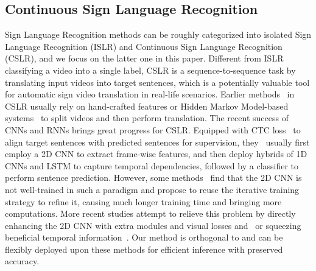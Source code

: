 \documentclass[sigconf]{acmart}
\begin{document}
\subsection{Continuous Sign Language Recognition}
Sign Language Recognition methods can be roughly categorized into isolated Sign Language Recognition (ISLR) and Continuous Sign Language Recognition (CSLR), and we focus on the latter one in this paper. Different from ISLR classifying a video into a single label, CSLR is a sequence-to-sequence task by translating input videos into target sentences, which is a potentially valuable tool for automatic sign video translation in real-life scenarios. Earlier methods~\cite{gao2004chinese,han2009modelling,freeman1995orientation,koller2015continuous} in CSLR usually rely on hand-crafted features or Hidden Markov Model-based systems~\cite{koller2016deepsign,koller2017re,koller2016deep} to split videos and then perform translation. The recent success of CNNs and RNNs brings great progress for CSLR. Equipped with CTC loss~\cite{graves2006connectionist} to align target sentences with predicted sentences for supervision, they~\cite{cihan2017subunets,cui2017recurrent,cui2017recurrent,pu2019iterative,cui2019deep,cheng2020fully,Min_2021_ICCV} usually first employ a 2D CNN to extract frame-wise features, and then deploy hybrids of 1D CNNs and LSTM to capture temporal dependencies, followed by a classifier to perform sentence prediction. However, some methods~\cite{cui2017recurrent,pu2019iterative,cui2019deep} find that the 2D CNN is not well-trained in such a paradigm and propose to reuse the iterative training strategy to refine it, causing much longer training time and bringing more computations. More recent studies attempt to relieve this problem by directly enhancing the 2D CNN with extra modules and visual losses and~\cite{cheng2020fully, Min_2021_ICCV,hao2021self} or squeezing beneficial temporal information~\cite{hu2022temporal}. Our method is orthogonal to and can be flexibly deployed upon these methods for efficient inference with preserved accuracy.
  
\end{document}
